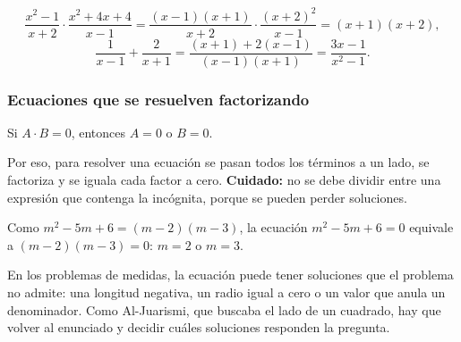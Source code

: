 \documentclass[11pt]{article}
\begin{document}
\begin{ejemplo}
\[
  \frac{x^2 - 1}{x + 2} \cdot \frac{x^2 + 4x + 4}{x - 1}
  = \frac{(x - 1)(x + 1)}{x + 2} \cdot \frac{(x + 2)^2}{x - 1} = (x + 1)(x + 2),
\]
\[
  \frac{1}{x - 1} + \frac{2}{x + 1}
  = \frac{(x + 1) + 2(x - 1)}{(x - 1)(x + 1)} = \frac{3x - 1}{x^2 - 1}.
\]
\end{ejemplo}

\subsubsection*{Ecuaciones que se resuelven factorizando}

\begin{teorema}
Si $A \cdot B = 0$, entonces $A = 0$ o $B = 0$.
\end{teorema}

Por eso, para resolver una ecuación se pasan todos los términos a un lado,
se factoriza y se iguala cada factor a cero. \textbf{Cuidado:} no se debe
dividir entre una expresión que contenga la incógnita, porque se pueden
perder soluciones.

\begin{ejemplo}
Como $m^2 - 5m + 6 = (m - 2)(m - 3)$, la ecuación $m^2 - 5m + 6 = 0$ equivale
a $(m - 2)(m - 3) = 0$: $m = 2$ o $m = 3$.
\end{ejemplo}

\begin{aplicacion}
En los problemas de medidas, la ecuación puede tener soluciones que el
problema no admite: una longitud negativa, un radio igual a cero o un valor
que anula un denominador. Como Al-Juarismi, que buscaba el lado de un
cuadrado, hay que volver al enunciado y decidir cuáles soluciones responden
la pregunta.
\end{aplicacion}
\end{document}
